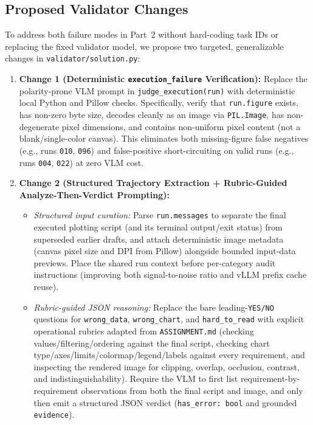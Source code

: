 \documentclass[11pt]{article}
\begin{document}
\subsection{Proposed Validator Changes}
To address both failure modes in Part~2 without hard-coding task IDs or replacing the fixed validator model, we propose two targeted, generalizable changes in \texttt{validator/solution.py}:

\begin{enumerate}
    \item \textbf{Change 1 (Deterministic \texttt{execution\_failure} Verification):} Replace the polarity-prone VLM prompt in \texttt{judge\_execution(run)} with deterministic local Python and Pillow checks. Specifically, verify that \texttt{run.figure} exists, has non-zero byte size, decodes cleanly as an image via \texttt{PIL.Image}, has non-degenerate pixel dimensions, and contains non-uniform pixel content (not a blank/single-color canvas). This eliminates both missing-figure false negatives (e.g., runs \texttt{010}, \texttt{096}) and false-positive short-circuiting on valid runs (e.g., runs \texttt{004}, \texttt{022}) at zero VLM cost.
    \item \textbf{Change 2 (Structured Trajectory Extraction + Rubric-Guided Analyze-Then-Verdict Prompting):}
    \begin{itemize}
        \item \emph{Structured input curation:} Parse \texttt{run.messages} to separate the final executed plotting script (and its terminal output/exit status) from superseded earlier drafts, and attach deterministic image metadata (canvas pixel size and DPI from Pillow) alongside bounded input-data previews. Place the shared run context before per-category audit instructions (improving both signal-to-noise ratio and vLLM prefix cache reuse).
        \item \emph{Rubric-guided JSON reasoning:} Replace the bare leading-\texttt{YES/NO} questions for \texttt{wrong\_data}, \texttt{wrong\_chart}, and \texttt{hard\_to\_read} with explicit operational rubrics adapted from \texttt{ASSIGNMENT.md} (checking values/filtering/ordering against the final script, checking chart type/axes/limits/colormap/legend/labels against every requirement, and inspecting the rendered image for clipping, overlap, occlusion, contrast, and indistinguishability). Require the VLM to first list requirement-by-requirement observations from both the final script and image, and only then emit a structured JSON verdict (\texttt{has\_error: bool} and grounded \texttt{evidence}).
    \end{itemize}
\end{enumerate}
\end{document}
